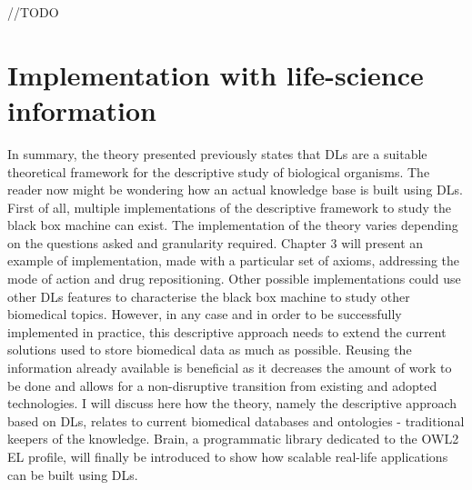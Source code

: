 //TODO

\section{Implementation with life-science information}

In summary, the theory presented previously states that DLs are a suitable theoretical framework for the descriptive study of biological organisms. The reader now might be wondering how an actual knowledge base is built using DLs. First of all, multiple implementations of the descriptive framework to study the black box machine can exist. The implementation of the theory varies depending on the questions asked and granularity required. Chapter 3 will present an example of implementation, made with a particular set of axioms, addressing the mode of action and drug repositioning. Other possible implementations could use other DLs features to characterise the black box machine to study other biomedical topics. However, in any case and in order to be successfully implemented in practice, this descriptive approach needs to extend the current solutions used to store biomedical data as much as possible. Reusing the information already available is beneficial as it decreases the amount of work to be done and allows for a non-disruptive transition from existing and adopted technologies. I will discuss here how the theory, namely the descriptive approach based on DLs, relates to current biomedical databases and ontologies - traditional keepers of the knowledge. Brain, a programmatic library dedicated to the OWL2 EL profile, will finally be introduced to show how scalable real-life applications can be built using DLs.

